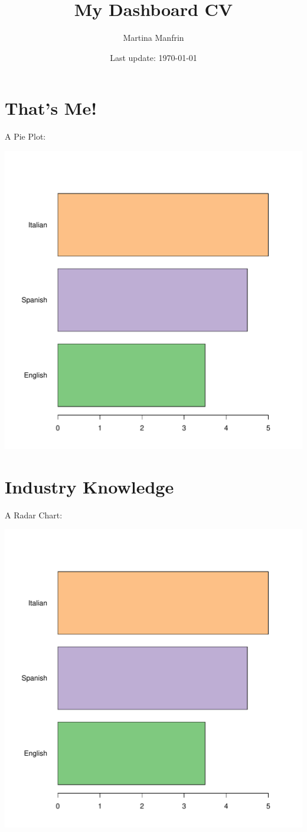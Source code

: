 \documentclass[10pt,a4paper]{article}
\author{Martina Manfrin}
\title{My Dashboard CV}
\date{Last update: \today}
\begin{document}

\maketitle

%
%


\section{That's Me!}
A Pie Plot:

\includegraphics[page=3]{Rplots.pdf}
\newpage


\section{Industry Knowledge}
A Radar Chart:

\includegraphics[page=5]{Rplots.pdf}
\newpage
\end{document}
